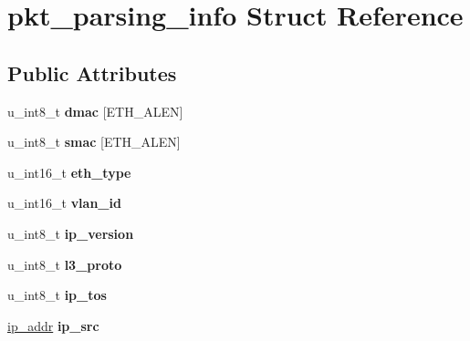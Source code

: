 \hypertarget{structpkt__parsing__info}{
\section{pkt\_\-parsing\_\-info Struct Reference}
\label{structpkt__parsing__info}
}
\subsection*{Public Attributes}
\begin{DoxyCompactItemize}
\item 
\hypertarget{structpkt__parsing__info_acbca86aab27efea4eaab7179742a72f3}{
u\_\-int8\_\-t {\bfseries dmac} \mbox{[}ETH\_\-ALEN\mbox{]}}
\label{structpkt__parsing__info_acbca86aab27efea4eaab7179742a72f3}

\item 
\hypertarget{structpkt__parsing__info_a54eeaa65c25d17c4a46d00f1c6ab2665}{
u\_\-int8\_\-t {\bfseries smac} \mbox{[}ETH\_\-ALEN\mbox{]}}
\label{structpkt__parsing__info_a54eeaa65c25d17c4a46d00f1c6ab2665}

\item 
\hypertarget{structpkt__parsing__info_ade2fce3fc13ce5c07cfca993341180e7}{
u\_\-int16\_\-t {\bfseries eth\_\-type}}
\label{structpkt__parsing__info_ade2fce3fc13ce5c07cfca993341180e7}

\item 
\hypertarget{structpkt__parsing__info_a5ee65ccd14b0ff9b191eff6b3d99c50e}{
u\_\-int16\_\-t {\bfseries vlan\_\-id}}
\label{structpkt__parsing__info_a5ee65ccd14b0ff9b191eff6b3d99c50e}

\item 
\hypertarget{structpkt__parsing__info_a217a9f5ec906442f62f8892ec45b01bd}{
u\_\-int8\_\-t {\bfseries ip\_\-version}}
\label{structpkt__parsing__info_a217a9f5ec906442f62f8892ec45b01bd}

\item 
\hypertarget{structpkt__parsing__info_a15426a76810fed9d14b966e4da5f4486}{
u\_\-int8\_\-t {\bfseries l3\_\-proto}}
\label{structpkt__parsing__info_a15426a76810fed9d14b966e4da5f4486}

\item 
\hypertarget{structpkt__parsing__info_a3e9e7ab5fdcd0c3e881b77569a41ebdc}{
u\_\-int8\_\-t {\bfseries ip\_\-tos}}
\label{structpkt__parsing__info_a3e9e7ab5fdcd0c3e881b77569a41ebdc}

\item 
\hypertarget{structpkt__parsing__info_a1b7737485cb20e26afdc0d3079993cc7}{
\hyperlink{unionip__addr}{ip\_\-addr} {\bfseries ip\_\-src}}
\label{structpkt__parsing__info_a1b7737485cb20e26afdc0d3079993cc7}


\end{DoxyCompactItemize}

